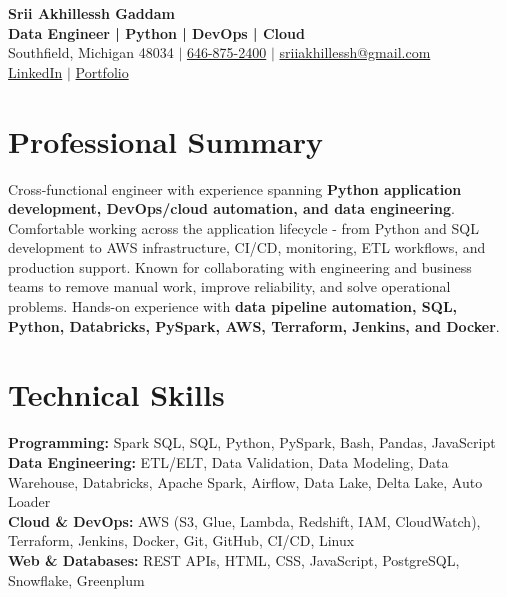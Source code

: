 \documentclass[letterpaper,10pt]{article}
\begin{document}
\fontsize{9.35pt}{10.45pt}\selectfont

\begin{center}
    {\LARGE \textbf{Srii Akhillessh Gaddam}} \\[-1pt]
    \textbf{Data Engineer | Python | DevOps | Cloud} \\[2pt]
    Southfield, Michigan 48034 $|$
    \href{tel:6468752400}{646-875-2400} $|$
    \href{mailto:sriiakhillessh@gmail.com}{sriiakhillessh@gmail.com} \\[1pt]
    \href{https://www.linkedin.com/in/srii-akhiilessh-gaddam-b48668191/}{LinkedIn} $|$
    \href{https://sriiakhillesshg.github.io/portfolio/}{Portfolio}
\end{center}
\vspace{-8pt}

\section{Professional Summary}
\small{Cross-functional engineer with experience spanning \textbf{Python application development, DevOps/cloud automation, and data engineering}. Comfortable working across the application lifecycle - from Python and SQL development to AWS infrastructure, CI/CD, monitoring, ETL workflows, and production support. Known for collaborating with engineering and business teams to remove manual work, improve reliability, and solve operational problems. Hands-on experience with \textbf{data pipeline automation, SQL, Python, Databricks, PySpark, AWS, Terraform, Jenkins, and Docker}.}

\section{Technical Skills}
\small{
\textbf{Programming:} Spark SQL, SQL, Python, PySpark, Bash, Pandas, JavaScript \\
\textbf{Data Engineering:} ETL/ELT, Data Validation, Data Modeling, Data Warehouse, Databricks, Apache Spark, Airflow, Data Lake, Delta Lake, Auto Loader \\
\textbf{Cloud \& DevOps:} AWS (S3, Glue, Lambda, Redshift, IAM, CloudWatch), Terraform, Jenkins, Docker, Git, GitHub, CI/CD, Linux \\
\textbf{Web \& Databases:} REST APIs, HTML, CSS, JavaScript, PostgreSQL, Snowflake, Greenplum
}
\end{document}
